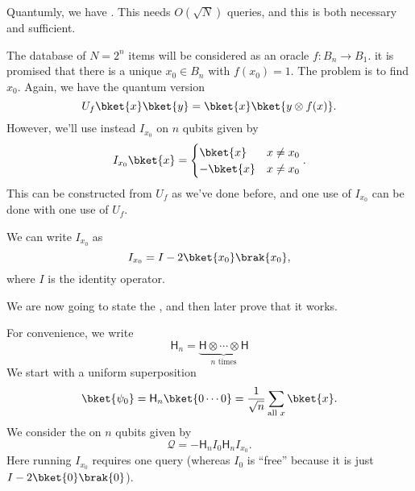 \documentclass[a4paper]{article}
\makeatletter
\newcommand\addstateend[4]{
  \pgfmathsetmacro{\y@y}{-#2 * 0.7};
  \pgfmathsetmacro{\x@x}{#3};
  \node [left] at (0, \y@y) {#1};
  \node [right] at (\x@x, \y@y) {#4};
  \draw (0, \y@y) -- (\x@x, \y@y);
}
\newcommand\addbigoperator[5]{
  \pgfmathsetmacro{\y@s}{-#2 * 0.7 + 0.2};
  \pgfmathsetmacro{\y@t}{-#3 * 0.7 - 0.2};
  \pgfmathsetmacro{\x@s}{#4};
  \pgfmathsetmacro{\x@t}{#5};
  \pgfmathsetmacro{\x@c}{(\x@s + \x@t)/2};
  \pgfmathsetmacro{\y@c}{(\y@s + \y@t)/2};

  \draw [fill=white] (\x@s, \y@s) rectangle (\x@t, \y@t);
  \node at (\x@c, \y@c) {#1};
}
\newcommand{\qH}{\mathsf{H}}
\makeatother
\begin{document}
Quantumly, we have . This needs $O(\sqrt{N})$ queries, and this is both necessary and sufficient.

The database of $N = 2^n$ items will be considered as an oracle $f: B_n \to B_1$. it is promised that there is a unique $x_0 \in B_n$ with $f(x_0) = 1$. The problem is to find $x_0$. Again, we have the quantum version
\[
  U_f \bket{x}\bket{y} = \bket{x} \bket{y \otimes f(x)}.
\]
However, we'll use instead $I_{x_0}$ on $n$ qubits given by
\[
  I_{x_0}\bket{x} =
  \begin{cases}
    \bket{x} & x \not= x_0\\
    -\bket{x} & x \not= x_0
  \end{cases}.
\]
This can be constructed from $U_f$ as we've done before, and one use of $I_{x_0}$ can be done with one use of $U_f$.
\begin{center}
\end{center}
We can write $I_{x_0}$ as
\[
  I_{x_0} = I - 2 \bket{x_0} \brak{x_0},
\]
where $I$ is the identity operator.

We are now going to state the , and then later prove that it works.

For convenience, we write
\[
  \qH_n = \underbrace{\qH \otimes \cdots \otimes \qH}_{n\text{ times}}
\]
We start with a uniform superposition
\[
  \bket{\psi_0} = \qH_n \bket{0\cdots0} = \frac{1}{\sqrt{n}} \sum_{\text{all }x} \bket{x}.
\]
We consider the  on $n$ qubits given by
\[
  \mathcal{Q} = -\qH_n I_0 \qH_n I_{x_0}.
\]
Here running $I_{x_0}$ requires one query (whereas $I_0$ is ``free'' because it is just $I - 2 \bket{0}\brak{0}$).
\end{document}
